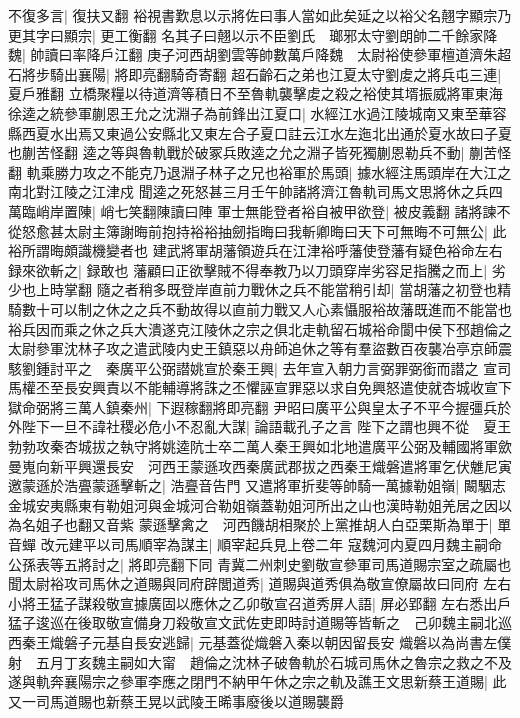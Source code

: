 不復多言|{
	復扶又翻}
裕視書歎息以示將佐曰事人當如此矣延之以裕父名翹字顯宗乃更其字曰顯宗|{
	更工衡翻}
名其子曰翹以示不臣劉氏　瑯邪太守劉朗帥二千餘家降魏|{
	帥讀曰率降戶江翻}
庚子河西胡劉雲等帥數萬戶降魏　太尉裕使參軍檀道濟朱超石將步騎出襄陽|{
	將即亮翻騎奇寄翻}
超石齡石之弟也江夏太守劉䖍之將兵屯三連|{
	夏戶雅翻}
立橋聚糧以待道濟等積日不至魯軌襲擊䖍之殺之裕使其壻振威將軍東海徐逵之統參軍蒯恩王允之沈淵子為前鋒出江夏口|{
	水經江水過江陵城南又東至華容縣西夏水出焉又東過公安縣北又東左合子夏口註云江水左迤北出通於夏水故曰子夏也蒯苦怪翻}
逵之等與魯軌戰於破冢兵敗逵之允之淵子皆死獨蒯恩勒兵不動|{
	蒯苦怪翻}
軌乘勝力攻之不能克乃退淵子林子之兄也裕軍於馬頭|{
	據水經注馬頭岸在大江之南北對江陵之江津戍}
聞逵之死怒甚三月壬午帥諸將濟江魯軌司馬文思將休之兵四萬臨峭岸置陳|{
	峭七笑翻陳讀曰陣}
軍士無能登者裕自被甲欲登|{
	被皮義翻}
諸將諫不從怒愈甚太尉主簿謝晦前抱持裕裕抽劒指晦曰我斬卿晦曰天下可無晦不可無公|{
	此裕所謂晦頗識機變者也}
建武將軍胡藩領遊兵在江津裕呼藩使登藩有疑色裕命左右録來欲斬之|{
	録敢也}
藩顧曰正欲擊賊不得奉教乃以刀頭穿岸劣容足指騰之而上|{
	劣少也上時掌翻}
隨之者稍多既登岸直前力戰休之兵不能當稍引却|{
	當胡藩之初登也精騎數十可以制之休之之兵不動故得以直前力戰又人心素懾服裕故藩既進而不能當也}
裕兵因而乘之休之兵大潰遂克江陵休之宗之俱北走軌留石城裕命閬中侯下邳趙倫之太尉參軍沈林子攻之遣武陵内史王鎮惡以舟師追休之等有羣盜數百夜襲冶亭京師震駭劉鍾討平之　秦廣平公弼譛姚宣於秦王興|{
	去年宣入朝力言弼罪弼銜而譛之}
宣司馬權丕至長安興責以不能輔導將誅之丕懼誣宣罪惡以求自免興怒遣使就杏城收宣下獄命弼將三萬人鎮秦州|{
	下遐稼翻將即亮翻}
尹昭曰廣平公與皇太子不平今握彊兵於外陛下一旦不諱社稷必危小不忍亂大謀|{
	論語載孔子之言}
陛下之謂也興不從　夏王勃勃攻秦杏城拔之執守將姚逵阬士卒二萬人秦王興如北地遣廣平公弼及輔國將軍歛曼嵬向新平興還長安　河西王蒙遜攻西秦廣武郡拔之西秦王熾磐遣將軍乞伏魋尼寅邀蒙遜於浩亹蒙遜擊斬之|{
	浩亹音告門}
又遣將軍折斐等帥騎一萬據勒姐嶺|{
	闞駰志金城安夷縣東有勒姐河與金城河合勒姐嶺蓋勒姐河所出之山也漢時勒姐羌居之因以為名姐子也翻又音紫}
蒙遜擊禽之　河西饑胡相聚於上黨推胡人白亞栗斯為單于|{
	單音蟬}
改元建平以司馬順宰為謀主|{
	順宰起兵見上卷二年}
寇魏河内夏四月魏主嗣命公孫表等五將討之|{
	將即亮翻下同}
青冀二州刺史劉敬宣參軍司馬道賜宗室之疏屬也聞太尉裕攻司馬休之道賜與同府辟閭道秀|{
	道賜與道秀俱為敬宣僚屬故曰同府}
左右小將王猛子謀殺敬宣據廣固以應休之乙卯敬宣召道秀屏人語|{
	屏必郢翻}
左右悉出戶猛子逡巡在後取敬宣備身刀殺敬宣文武佐吏即時討道賜等皆斬之　己卯魏主嗣北巡　西秦王熾磐子元基自長安逃歸|{
	元基蓋從熾磐入秦以朝因留長安}
熾磐以為尚書左僕射　五月丁亥魏主嗣如大甯　趙倫之沈林子破魯軌於石城司馬休之魯宗之救之不及遂與軌奔襄陽宗之參軍李應之閉門不納甲午休之宗之軌及譙王文思新蔡王道賜|{
	此又一司馬道賜也新蔡王晃以武陵王晞事廢後以道賜襲爵}
